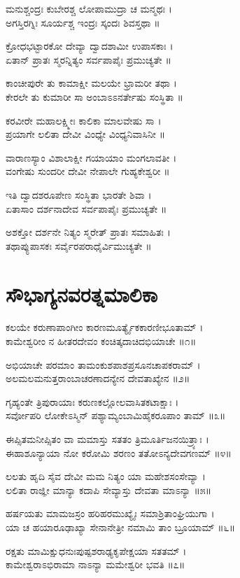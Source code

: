 ಮನುಶ್ಚಂದ್ರಃ ಕುಬೇರಶ್ಚ ಲೋಪಾಮುದ್ರಾ ಚ ಮನ್ಮಥಃ ।\\
ಅಗಸ್ತಿರಗ್ನಿಃ ಸೂರ್ಯಶ್ಚ ಇಂದ್ರಃ ಸ್ಕಂದಃ ಶಿವಸ್ತಥಾ ॥

ಕ್ರೋಧಭಟ್ಟಾರಕೋ ದೇವ್ಯಾ ದ್ವಾದಶಾಮೀ ಉಪಾಸಕಾಃ ।\\
ಏತಾನ್ ಪ್ರಾತಃ ಸ್ಮರನ್ನಿತ್ಯಂ ಸರ್ವಪಾಪೈಃ ಪ್ರಮುಚ್ಯತೇ ॥

ಕಾಂಚೀಪುರೇ ತು ಕಾಮಾಕ್ಷೀ ಮಲಯೇ ಭ್ರಾಮರೀ ತಥಾ ।\\
ಕೇರಲೇ ತು ಕುಮಾರೀ ಸಾ ಅಂಬಾಽಽನರ್ತೇಷು ಸಂಸ್ಥಿತಾ ॥

ಕರವೀರೇ ಮಹಾಲಕ್ಷ್ಮೀಃ ಕಾಲಿಕಾ ಮಾಲವೇಷು ಸಾ ।\\
ಪ್ರಯಾಗೇ ಲಲಿತಾ ದೇವೀ ವಿಂಧ್ಯೇ ವಿಂಧ್ಯನಿವಾಸಿನೀ ॥

ವಾರಾಣಸ್ಯಾಂ ವಿಶಾಲಾಕ್ಷೀ ಗಯಾಯಾಂ ಮಂಗಲಾವತೀ ।\\
ವಂಗೇಷು ಸುಂದರೀ ದೇವೀ ನೇಪಾಲೇ ಗುಹ್ಯಕೇಶ್ವರೀ ॥

ಇತಿ ದ್ವಾದಶರೂಪೇಣ ಸಂಸ್ಥಿತಾ ಭಾರತೇ ಶಿವಾ ।\\
ಏತಾಸಾಂ ದರ್ಶನಾದೇವ ಸರ್ವಪಾಪೈಃ ಪ್ರಮುಚ್ಯತೇ ॥

ಅಶಕ್ತೋ ದರ್ಶನೇ ನಿತ್ಯಂ ಸ್ಮರೇತ್ ಪ್ರಾತಃ ಸಮಾಹಿತಃ ।\\
ತಥಾಪ್ಯುಪಾಸಕಃ ಸರ್ವೈರಪರಾಧೈರ್ವಿಮುಚ್ಯತೇ ॥


\section{ಸೌಭಾಗ್ಯನವರತ್ನಮಾಲಿಕಾ}
ಕಲಯೇ ಕರುಣಾಪಾಂಗೀಂ ಕಾರಣಮೂರ್ತ್ಯೈಕಕಾರಣೀಭೂತಾಮ್ ।\\
ಕಾಮೇಶ್ವರೀಂ ನ ಹೀತರದೇವಂ ಕಂಚಿತ್ಕದಾಚಿದಭಿಯಾಚೇ ॥೧॥

ಅಭಿಯಾಚೇ ಪರಮಾಂ ತಾಮಂಕುಶಪಾಶಪ್ರಸೂನಚಾಪಕರಾಮ್ ।\\
ಅಲಮಲಮನುತ್ತರಾಂಬಾಚರಣಾದನ್ಯೇನ ದೇವತಾಖ್ಯೇನ ॥೨॥

ಗೃಹ್ಯಂತೇ ತ್ರಿಪುರಾಯಾಃ ಕರುಣಕಲ್ಲೋಲವಾಸಿತಕಟಾಕ್ಷಾಃ ।\\
ಸರ್ವೋಪರಿ ಲೋಕೇಽಸ್ಮಿನ್ ಪಶ್ಯಾಮ್ಯಂಬಾಮಿಹೈಕರೂಪಾಂ ತಾಮ್ ॥೩॥

ಈಪ್ಸಿತಮನೀಪ್ಸಿತಂ ವಾ ಮಮಾಸ್ತು ಸತತಂ ತ್ರಿಮೂರ್ತಿಜನಯಿತ್ರ್ಯಾಃ ।\\
ಈಹಾಶೂನ್ಯಾಯಾ ನೋ ಕರೋಮಿ ಶರಣಂ ತತೋಽನ್ಯದೇವಗಣಮ್ ॥೪॥

ಲಲತು ಹೃದಿ ಸೈವ ದೇವೀ ಮಮ ನಿತ್ಯಂ ಯಾ ಮಹೇಶಸಂಸೇವ್ಯಾ ।\\
ಲಲಿತಾ ರಾಜ್ಞೀ ಮಾನ್ಯಾ ಕದಾಪಿ ಸೇವ್ಯಾಸ್ತು ದೇವತಾ ಮಾಽನ್ಯಾ ॥೫॥ 

ಹರ್ಷಯತು ಮಾಮಜಸ್ರಂ ಹರಿಹರಮುಖ್ಯೈಃ ಸಮಾಶ್ರಿತಾಂಘ್ರಿಯುಗಾ ।\\
ಯಾ ಚ ಹಯಾರೂಢಾಖ್ಯಾ ಸೇನಾನೇತ್ರೀ ನಮಾಮಿ ತಾಂ ಬ್ರೂಯಾಮ್ ॥೬॥

ರಕ್ಷತು ಮಾಮಿಕ್ಷುಧನುಃಪುಷ್ಪಶರಾಢ್ಯಕೃಪೇಕ್ಷಯಾ ಸತತಮ್ ।\\
ಕಾಮೇಶ್ವರಾಽಭಿರಾಮಾ ನಾಽನ್ಯಾ ಮಮೇಶ್ವರೀ ಭವತಿ ॥೭॥

